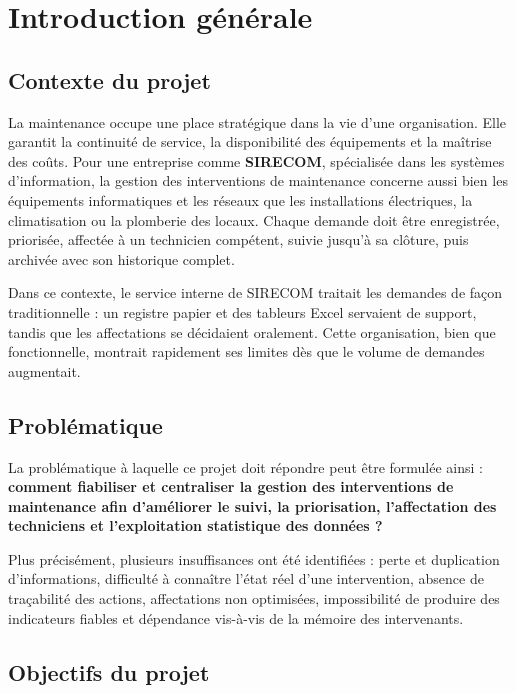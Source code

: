 \documentclass[11pt,a4paper]{report}
\begin{document}
\chapter*{Introduction générale}
\section*{Contexte du projet}

La maintenance occupe une place stratégique dans la vie d'une organisation. Elle garantit la continuité de service, la disponibilité des équipements et la maîtrise des coûts. Pour une entreprise comme \textbf{SIRECOM}, spécialisée dans les systèmes d'information, la gestion des interventions de maintenance concerne aussi bien les équipements informatiques et les réseaux que les installations électriques, la climatisation ou la plomberie des locaux. Chaque demande doit être enregistrée, priorisée, affectée à un technicien compétent, suivie jusqu'à sa clôture, puis archivée avec son historique complet.

Dans ce contexte, le service interne de SIRECOM traitait les demandes de façon traditionnelle : un registre papier et des tableurs Excel servaient de support, tandis que les affectations se décidaient oralement. Cette organisation, bien que fonctionnelle, montrait rapidement ses limites dès que le volume de demandes augmentait.
\section*{Problématique}

La problématique à laquelle ce projet doit répondre peut être formulée ainsi : \textbf{comment fiabiliser et centraliser la gestion des interventions de maintenance afin d'améliorer le suivi, la priorisation, l'affectation des techniciens et l'exploitation statistique des données ?}

Plus précisément, plusieurs insuffisances ont été identifiées : perte et duplication d'informations, difficulté à connaître l'état réel d'une intervention, absence de traçabilité des actions, affectations non optimisées, impossibilité de produire des indicateurs fiables et dépendance vis-à-vis de la mémoire des intervenants.
\section*{Objectifs du projet}
\end{document}

